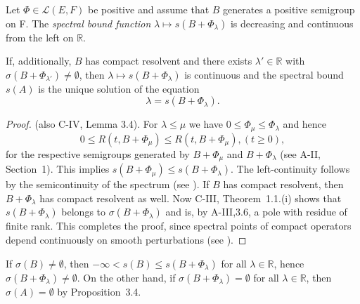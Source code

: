 \begin{proposition}\label{prop:b4-3.6}
%
	Let $\Phi \in \mathcal{L}(E,F)$ be positive and assume that $B$ generates a positive semigroup on F. 
    The \emph{spectral bound function} $\lambda \mapsto s(B + \Phi_\lambda)$ is decreasing and continuous from the left on $\mathbb{R}$.
	
	If, additionally, $B$ has compact resolvent and there exists $\lambda' \in \mathbb{R}$ with $\sigma(B + \Phi_{\lambda'}) \neq \emptyset$, then $\lambda \mapsto s(B + \Phi_\lambda)$ is continuous and the spectral bound $s(A)$ is the unique solution of the equation
	\begin{equation}\label{eq:b4-3.5}
		\lambda = s(B + \Phi_\lambda) .
	\end{equation}
\end{proposition}
\begin{proof} (\cf also C-IV, Lemma 3.4). 
For $\lambda \leq \mu$ we have $0 \leq \Phi_\mu \leq \Phi_\lambda$ and hence 
\[
0 \leq R(t, B +\Phi_\mu) \leq R(t,B+\Phi_\mu) , (t\geq 0) , 
\]
for the respective semigroups generated by $B + \Phi_\mu$ and $B + \Phi_\lambda$ (see A-II, Section~1). 
This implies $s(B + \Phi_\mu) \leq s(B + \Phi_\lambda)$. 
The left-continuity follows by the semicontinuity of the spectrum (see \citet[Chapter~IV, Theorem~3.1]{kato:1966}). 
If $B$ has compact resolvent, then $B + \Phi_\lambda$ has compact resolvent as well. 
Now C-III, Theorem~1.1.(i) shows that $s(B + \Phi_\lambda)$ belongs to $\sigma(B + \Phi_\lambda)$ and is, by A-III,3.6, a pole with residue of finite rank. 
This completes the proof, since spectral points of compact operators depend continuously on smooth perturbations (see \citet[VII,6.Theorem~9]{dunfordschwartz:1958}).
\end{proof}
If $\sigma(B) \neq \emptyset$, then $-\infty < s(B) \leq s(B + \Phi_\lambda)$ for all $\lambda \in \mathbb{R}$, 
hence $\sigma(B + \Phi_\lambda) \neq \emptyset$. 
On the other hand, if $\sigma(B + \Phi_\lambda) = \emptyset$ for all $\lambda \in \mathbb{R}$,  then $\sigma(A) = \emptyset$ by Proposition~3.4.

